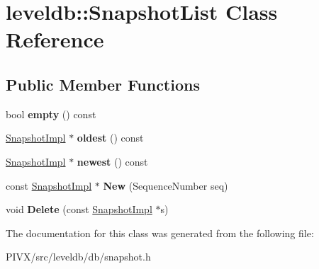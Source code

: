 \hypertarget{classleveldb_1_1_snapshot_list}{}\section{leveldb\+:\+:Snapshot\+List Class Reference}
\label{classleveldb_1_1_snapshot_list}
\subsection*{Public Member Functions}
\begin{DoxyCompactItemize}
\item 
\mbox{\label{classleveldb_1_1_snapshot_list_a1db6b1cbcd79669168052e088e8af84e}} 
bool {\bfseries empty} () const
\item 
\mbox{\label{classleveldb_1_1_snapshot_list_a2a7757163b6f737771430e3ea1697963}} 
\mbox{\hyperlink{classleveldb_1_1_snapshot_impl}{Snapshot\+Impl}} $\ast$ {\bfseries oldest} () const
\item 
\mbox{\label{classleveldb_1_1_snapshot_list_ae4480f4d9059d78623773b7e87aad11b}} 
\mbox{\hyperlink{classleveldb_1_1_snapshot_impl}{Snapshot\+Impl}} $\ast$ {\bfseries newest} () const
\item 
\mbox{\label{classleveldb_1_1_snapshot_list_adfd5d9c7cb888e711d83a48299141994}} 
const \mbox{\hyperlink{classleveldb_1_1_snapshot_impl}{Snapshot\+Impl}} $\ast$ {\bfseries New} (Sequence\+Number seq)
\item 
\mbox{\label{classleveldb_1_1_snapshot_list_aa16863f35b8bb6dbc44f4528fab6790a}} 
void {\bfseries Delete} (const \mbox{\hyperlink{classleveldb_1_1_snapshot_impl}{Snapshot\+Impl}} $\ast$s)
\end{DoxyCompactItemize}


The documentation for this class was generated from the following file\+:\begin{DoxyCompactItemize}
\item 
P\+I\+V\+X/src/leveldb/db/snapshot.\+h\end{DoxyCompactItemize}
